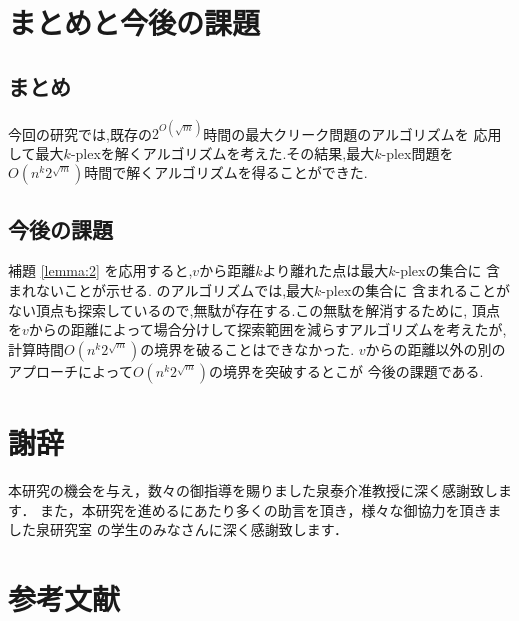 \documentclass{thesis}
\theoremstyle{definition}
\begin{document}
\chapter{まとめと今後の課題}
\section{まとめ}
今回の研究では,既存の$2^{O(\sqrt{m})}$時間の最大クリーク問題のアルゴリズムを
応用して最大$k$-plexを解くアルゴリズムを考えた.その結果,最大$k$-plex問題を
$O(n^{k}2^{\sqrt{m}})$時間で解くアルゴリズムを得ることができた.

\section{今後の課題}
補題  \ref{lemma:2} を応用すると,$v$から距離$k$より離れた点は最大$k$-plexの集合に
含まれないことが示せる. \label{section:2plex} のアルゴリズムでは,最大$k$-plexの集合に
含まれることがない頂点も探索しているので,無駄が存在する.この無駄を解消するために,
頂点を$v$からの距離によって場合分けして探索範囲を減らすアルゴリズムを考えたが,
計算時間$O(n^{k}2^{\sqrt{m}})$の境界を破ることはできなかった.
$v$からの距離以外の別のアプローチによって$O(n^{k}2^{\sqrt{m}})$の境界を突破するとこが
今後の課題である.

\newpage

\chapter*{謝辞}
本研究の機会を与え，数々の御指導を賜りました泉泰介准教授に深く感謝致します．
また，本研究を進めるにあたり多くの助言を頂き，様々な御協力を頂きました泉研究室
の学生のみなさんに深く感謝致します．

\newpage

\chapter*{参考文献}
\end{document}
